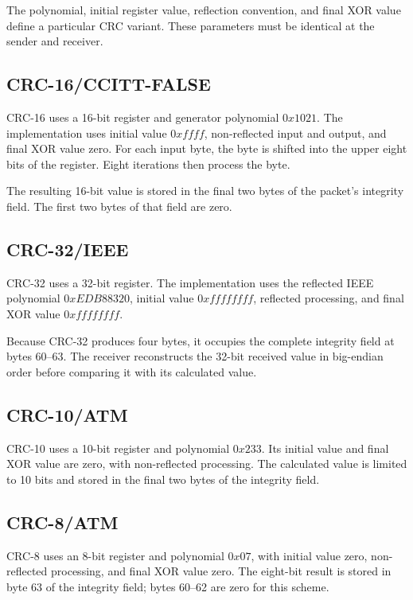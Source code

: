 \documentclass[12pt,a4paper]{article}
\begin{document}
The polynomial, initial register value, reflection convention, and final XOR
value define a particular CRC variant. These parameters must be identical at
the sender and receiver.

\subsection{CRC-16/CCITT-FALSE}

CRC-16 uses a 16-bit register and generator polynomial $0x1021$. The
implementation uses initial value $0xffff$, non-reflected input and output,
and final XOR value zero. For each input byte, the byte is shifted into the
upper eight bits of the register. Eight iterations then process the byte.

The resulting 16-bit value is stored in the final two bytes of the packet's
integrity field. The first two bytes of that field are zero.

\subsection{CRC-32/IEEE}

CRC-32 uses a 32-bit register. The implementation uses the reflected IEEE
polynomial $0xEDB88320$, initial value $0xffffffff$, reflected processing, and
final XOR value $0xffffffff$.

Because CRC-32 produces four bytes, it occupies the complete integrity field
at bytes 60--63. The receiver reconstructs the 32-bit received value in
big-endian order before comparing it with its calculated value.

\subsection{CRC-10/ATM}

CRC-10 uses a 10-bit register and polynomial $0x233$. Its initial value and
final XOR value are zero, with non-reflected processing. The calculated value
is limited to 10 bits and stored in the final two bytes of the integrity
field.

\subsection{CRC-8/ATM}

CRC-8 uses an 8-bit register and polynomial $0x07$, with initial value zero,
non-reflected processing, and final XOR value zero. The eight-bit result is
stored in byte 63 of the integrity field; bytes 60--62 are zero for this
scheme.
\end{document}
